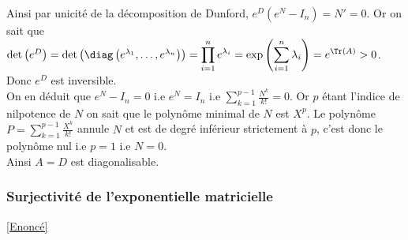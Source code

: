 \documentclass[8pt]{book}
\begin{document}
	Ainsi par unicité de la décomposition de Dunford, $e^D(e^N-I_n)=N'=0$. Or on sait que $\det\left(e^D\right)=\det\left(\diag\left(e^{\lambda_1},\dots,e^{\lambda_n}\right)\right)=\displaystyle\prod_{i=1}^ne^{\lambda_i}=\exp\left(\sum_{i=1}^n\lambda_i\right)=e^{\Tr(A)}>0$. Donc $e^D$ est inversible.\\
	On en déduit que $e^N-I_n=0$ i.e $e^N=I_n$ i.e $\displaystyle\sum_{k=1}^{p-1}\frac{N^k}{k!}=0$. Or $p$ étant l'indice de nilpotence de $N$ on sait que le polynôme minimal de $N$ est $X^p$. Le polynôme $P=\displaystyle\sum_{k=1}^{p-1}\frac{X^k}{k!}$ annule $N$ et est de degré inférieur strictement à $p$, c'est donc le polynôme nul i.e $p=1$ i.e $N=0$.\\
	Ainsi $A=D$ est diagonalisable.
	
	\subsubsection{Surjectivité de l'exponentielle matricielle }
	\label{Surjectivité de l'exponentielle matricielle corrigé}
	\textcolor{blue}{\hyperref[Surjectivité de l'exponentielle matricielle]{[Enoncé]}}\\
\end{document}
